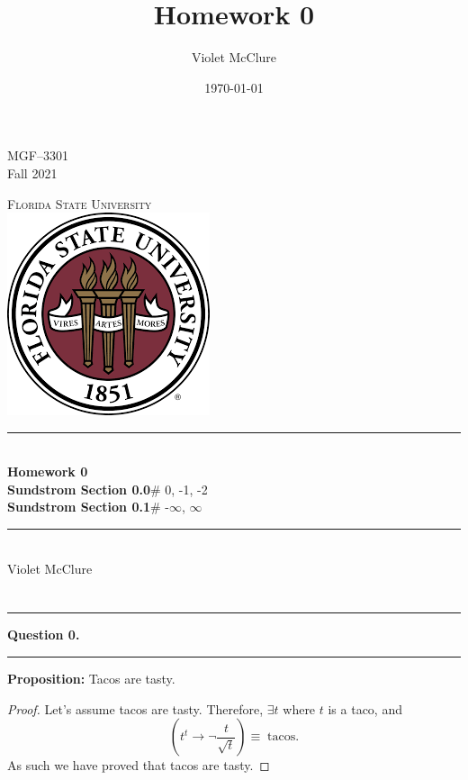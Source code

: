 \documentclass[letter]{article}
\title{Homework 0}
\author{Violet McClure}
\date{\today}
\theoremstyle{definition}
\newcommand*\question[1]{%
  \noindent\rule{\textwidth}{0.4pt}
  \Large
  \textbf{Question #1.} \\\vspace{-9pt}%
  \noindent\rule{\textwidth}{0.4pt}\vspace{-20pt}
}
\begin{document}
\begin{titlepage} %
  \Large
  \begin{flushright}
    MGF--3301 \\
    Fall 2021 \\
  \end{flushright}
  \begin{center}
    \vspace{0.4in} \textsc{\Huge Florida State University} \\
    \vspace{0.4in} \includegraphics[scale=0.75]{fsu_logo.png} \\
    \vspace{0.4in} \rule[0.2cm]{13cm}{0.1cm} \\ \vspace{0.4cm}
    {\Huge \bfseries Homework 0} \\[0.4cm]
    {\LARGE \bfseries Sundstrom Section 0.0}{\Large \quad \# 0, -1, -2} \\
    {\LARGE \bfseries Sundstrom Section 0.1}{\Large \quad \# -$\infty$, $\infty$ } \\
    \vspace{0.4in} \rule[0.2cm]{13cm}{0.1cm} \\
    \vspace*{\fill}
    Violet McClure 
  \end{center}
\end{titlepage} %

\section*{}

\question{0}

\textbf{Proposition:} Tacos are tasty.

\begin{proof}
  Let's assume tacos are tasty. Therefore, $\exists t$ where $t$ is a taco, and
  $$
  \left( t^t \rightarrow \neg\frac{t}{\sqrt{t}} \right) \equiv \;\mathrm{tacos}.
  $$
  As such we have proved that tacos are tasty.
\end{proof}
\end{document}
